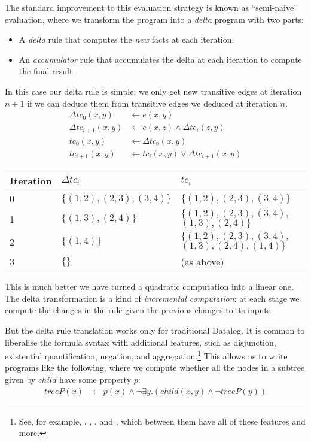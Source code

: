 The standard improvement to this evaluation strategy is known as ``semi-naive'' 
evaluation\autocite[See][section 13.1]{abiteboul1995foundations}, where we transform 
the program into a \emph{delta} program with two parts:
\begin{itemize}
  \item A \emph{delta} rule that computes the \emph{new} facts at each
    iteration. 
  \item An \emph{accumulator} rule that accumulates the delta at each
    iteration to compute the final result
\end{itemize}
In this case our delta rule is simple: we only get new transitive edges at iteration $n+1$ if we
can deduce them from transitive edges we deduced at iteration $n$.
\begin{align*}
  \Delta tc_{0}(x, y) &\leftarrow e(x, y)\\
  \Delta tc_{i+1}(x, y) &\leftarrow e(x, z) \wedge \Delta tc_i(z, y)\\
  tc_{0}(x, y) &\leftarrow \Delta tc_0(x, y)\\
  tc_{i+1}(x, y) &\leftarrow tc_{i}(x,y) \vee \Delta tc_{i+1}(x,y)
\end{align*}

\begin{center}
  \begin{tabular} {p{3.5em} p{8em} p{10em}}
    Iteration & $\Delta tc_i$ & $tc_i$ \\
    \toprule
    0 & $\{ (1, 2), (2, 3), (3, 4) \}$ & $\{ (1, 2), (2, 3), (3, 4) \}$\\
    1 & $\{ (1, 3), (2, 4) \}$ & $\{ (1, 2), (2, 3), (3, 4),$ $(1, 3), (2, 4) \}$\\
    2 & $\{ (1, 4) \}$ & $\{ (1, 2), (2, 3), (3, 4),$ $(1, 3), (2, 4), (1, 4) \}$\\
    3 & $\{ \}$ & (as above) \\
    \bottomrule
  \end{tabular}
\end{center}
\medskip

This is much better \textemdash{} we have turned a quadratic computation into a
linear one. The delta transformation is a kind of \emph{incremental
  computation}: at each stage we compute the changes in the rule given the previous
changes to its inputs.

But the delta rule translation works only for traditional Datalog. It is common to
liberalise the formula syntax with additional features, such as disjunction,
existential quantification, negation, and aggregation.\footnote{See, for
  example, \autocites(LogiQL)(){logicbloxWebsite}{halpin2014logiql},
  \autocites(Datomic)(){datomicWebsite},
  \autocites(Souffle)(){souffleWebsite}{scholz2016fast}, and
  \autocites(DES)(){saenz2011deductive}, which between them have all of these
  features and more. } 
This allows us to write programs like the following, where we compute whether all the
nodes in a subtree given by $child$ have some property $p$:
\begin{align*}
  treeP(x) &\leftarrow p(x) \wedge \neg \exists y . (child(x,y) \wedge \neg treeP(y))
\end{align*}

